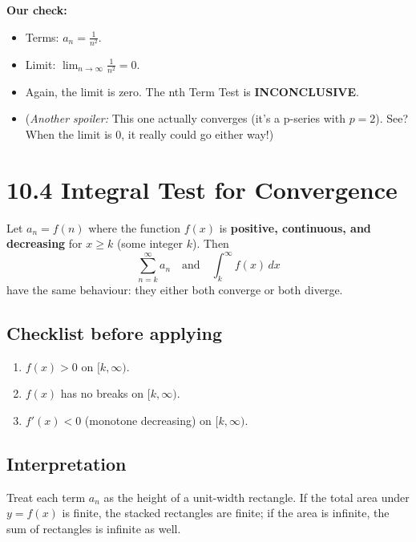 \documentclass{article}
\begin{document}
\begin{enumerate}[label=\textbf{\arabic*.},itemsep=15pt]
        \textbf{Our check:}
        \begin{itemize}
            \item Terms: \(a_n = \frac{1}{n^2}\).
            \item Limit: \(\lim_{n\to\infty} \frac{1}{n^2} = 0\).
            \item Again, the limit is zero. The nth Term Test is \textbf{INCONCLUSIVE}.
            \item (\textit{Another spoiler:} This one actually converges (it's a p-series with \(p=2\)). See? When the limit is 0, it really could go either way!)
        \end{itemize}
\end{enumerate}

\newpage
\section{10.4 Integral Test for Convergence}

\begin{tcolorbox}[colback=gray!8,colframe=black,title=Statement of the Test]
Let \(a_n = f(n)\) where the function \(f(x)\) is
\textbf{positive, continuous, and decreasing} for \(x \ge k\) (some integer \(k\)).
Then
\[
\sum_{n=k}^{\infty} a_n
\quad\text{and}\quad
\int_{k}^{\infty} f(x)\,dx
\]
have the same behaviour: they either both converge or both diverge.
\end{tcolorbox}

\subsection*{Checklist before applying}
\begin{enumerate}[label=\arabic*. ,itemsep=2pt]
  \item \(f(x) > 0\) on \([k,\infty)\).
  \item \(f(x)\) has no breaks on \([k,\infty)\).
  \item \(f'(x) < 0\) (monotone decreasing) on \([k,\infty)\).
\end{enumerate}

\subsection*{Interpretation}
Treat each term \(a_n\) as the height of a unit-width rectangle.
If the total area under \(y=f(x)\) is finite, the stacked rectangles are finite;
if the area is infinite, the sum of rectangles is infinite as well.
\end{document}
